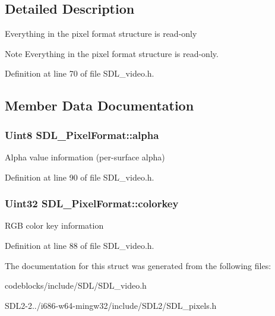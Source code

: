 \subsection{Detailed Description}
Everything in the pixel format structure is read-\/only

\begin{DoxyNote}{Note}
Everything in the pixel format structure is read-\/only. 
\end{DoxyNote}


Definition at line 70 of file S\+D\+L\+\_\+video.\+h.



\subsection{Member Data Documentation}
\hypertarget{structSDL__PixelFormat_a0b0fd9deaec730811212ecdeaa24c7ea}{
\subsubsection[{alpha}]{\setlength{\rightskip}{0pt plus 5cm}Uint8 S\+D\+L\+\_\+\+Pixel\+Format\+::alpha}}\label{structSDL__PixelFormat_a0b0fd9deaec730811212ecdeaa24c7ea}
Alpha value information (per-\/surface alpha) 

Definition at line 90 of file S\+D\+L\+\_\+video.\+h.

\hypertarget{structSDL__PixelFormat_a1413d87ed860296a49f8b2d8fd8ad778}{
\subsubsection[{colorkey}]{\setlength{\rightskip}{0pt plus 5cm}Uint32 S\+D\+L\+\_\+\+Pixel\+Format\+::colorkey}}\label{structSDL__PixelFormat_a1413d87ed860296a49f8b2d8fd8ad778}
R\+G\+B color key information 

Definition at line 88 of file S\+D\+L\+\_\+video.\+h.



The documentation for this struct was generated from the following files\+:\begin{DoxyCompactItemize}
\item 
codeblocks/include/\+S\+D\+L/S\+D\+L\+\_\+video.\+h\item 
S\+D\+L2-\/2../i686-\/w64-\/mingw32/include/\+S\+D\+L2/S\+D\+L\+\_\+pixels.\+h\end{DoxyCompactItemize}
